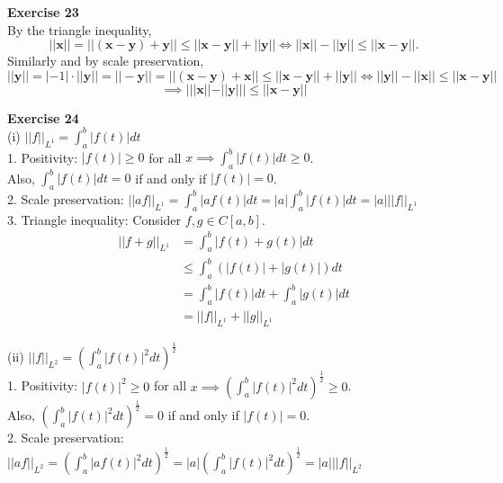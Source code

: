 \documentclass[letterpaper,12pt]{article}
\let\vec\mathbf
\theoremstyle{definition}
\begin{document}
\textbf{Exercise 23} \\
By the triangle inequality, \\
\begin{equation*}
  ||\vec{x}|| = ||(\vec{x} - \vec{y}) + \vec{y}|| \leq ||\vec{x} - \vec{y}|| + ||\vec{y}||
  \Leftrightarrow ||\vec{x}|| - ||\vec{y}|| \leq ||\vec{x} - \vec{y}||.
\end{equation*}
Similarly and by scale preservation, \\
\begin{equation*}
  ||\vec{y}|| = |-1| \cdot ||\vec{y}|| = ||-\vec{y}|| = ||(\vec{x} - \vec{y}) + \vec{x}|| \leq ||\vec{x} - \vec{y}|| + ||\vec{y}||
  \Leftrightarrow ||\vec{y}|| - ||\vec{x}|| \leq ||\vec{x} - \vec{y}||
\end{equation*}
\begin{equation*}
  \implies |||\vec{x}|| - ||\vec{y}||| \leq ||\vec{x} - \vec{y}||
\end{equation*}

\textbf{Exercise 24} \\
(i) $||f||_{L^1} = \int_a^b |f(t)| dt$ \\
1. Positivity: $|f(t)| \geq 0$ for all $x \implies \int_a^b |f(t)|dt \geq 0$. \\
Also, $\int_a^b |f(t)|dt = 0$ if and only if $|f(t)| = 0$. \\

2. Scale preservation: $||af||_{L^1} = \int_a^b |af(t)| dt = |a| \int_a^b |f(t)| dt = |a| ||f||_{L^1}$ \\

3. Triangle inequality: Consider $f, g \in C[a, b]$.
\begin{align*}
  || f + g ||_{L^1} &= \int_a^b |f(t) + g(t)| dt \\
  &\leq \int_a^b (|f(t)| + |g(t)|) dt \\
  &= \int_a^b |f(t)|dt + \int_a^b |g(t)|dt \\
  &= ||f||_{L^1} + ||g||_{L^1}
\end{align*}

(ii) $||f||_{L^2} = (\int_a^b |f(t)|^2 dt)^{\frac{1}{2}}$ \\
1. Positivity: $|f(t)|^2 \geq 0$ for all $x \implies (\int_a^b |f(t)|^2dt)^\frac{1}{2} \geq 0$. \\
Also, $(\int_a^b |f(t)|^2 dt)^\frac{1}{2} = 0$ if and only if $|f(t)| = 0$. \\

2. Scale preservation: $||af||_{L^2} = (\int_a^b |af(t)|^2 dt)^\frac{1}{2} = |a| (\int_a^b |f(t)|^2 dt)^\frac{1}{2} = |a| ||f||_{L^2}$ \\
\end{document}
